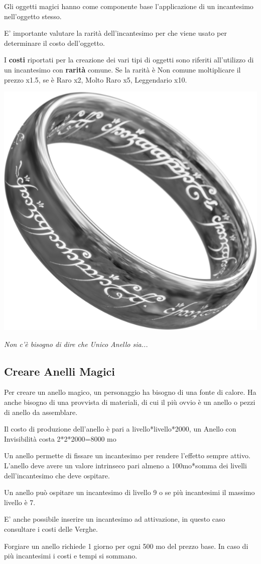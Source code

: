 \begin{multicols}{2}
Gli oggetti magici hanno come componente base l'applicazione di un incantesimo nell'oggetto stesso.

E' importante valutare la rarità dell'incantesimo per che viene usato per determinare il costo dell'oggetto.

I \textbf{costi} riportati per la creazione dei vari tipi di oggetti sono riferiti all'utilizzo di un incantesimo con \textbf{rarità} comune. Se la rarità è Non comune moltiplicare il prezzo x1.5, se è Raro x2, Molto Raro x5, Leggendario x10.

\begin{center}
	\includegraphics[width=0.3\linewidth]{immagini/onering2.png}
	
	\emph{Non c'è bisogno di dire che Unico Anello sia...}
\end{center}

\subsection{Creare Anelli Magici}\label{creareanellimagici}

Per creare un anello magico, un personaggio ha bisogno di una fonte di calore. Ha anche bisogno di una provvista di materiali, di cui il più ovvio è un anello o pezzi di anello da assemblare. 

Il costo di produzione dell'anello è pari a livello*livello*2000, un Anello con Invisibilità costa 2*2*2000=8000 mo

Un anello permette di fissare un incantesimo per rendere l'effetto sempre attivo.
L'anello deve avere un valore intrinseco pari almeno a 100mo*somma dei livelli dell'incantesimo che deve ospitare.

Un anello può ospitare un incantesimo di livello 9 o se più incantesimi il massimo livello è 7.

E' anche possibile inserire un incantesimo ad attivazione, in questo caso consultare i costi delle Verghe.

Forgiare un anello richiede 1 giorno per ogni 500 mo del prezzo base. In caso di più incantesimi i costi e tempi si sommano.


\end{multicols}
